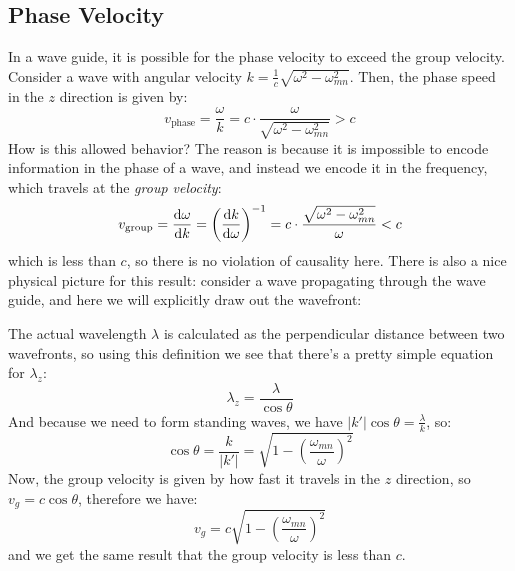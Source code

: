\subsection{Phase Velocity}
In a wave guide, it is possible for the phase velocity to exceed the group velocity. Consider a wave with
angular velocity \( k = \frac{1}{c}\sqrt{\omega^2 - \omega_{mn}^2} \). Then, the phase speed in the \( z \)
direction is given by:
\[
	v_\text{phase} = \frac{\omega}{k} = c \cdot \frac{\omega}{\sqrt{\omega^2 - \omega_{mn}^2}} > c
\]
How is this allowed behavior? The reason is because it is impossible to encode information in the phase of a
wave, and instead we encode it in the frequency, which travels at the \textit{group velocity}:
\[
	v_\text{group} = \dv{\omega}{k} = \left( \dv{k}{\omega} \right)^{-1} = c \cdot \frac{\sqrt{\omega^2 -
	\omega_{mn}^2}}{\omega} < c
\]
which is less than \( c \), so there is no violation of causality here. There is also a nice physical picture
for this result: consider a wave propagating through the wave guide, and here we will explicitly draw out the
wavefront:
\begin{center}
\end{center}
The actual wavelength \( \lambda \) is calculated as the perpendicular distance between two wavefronts, so
using this definition we see that there's a pretty simple equation for \( \lambda_z \):
\[
	\lambda_z = \frac{\lambda}{\cos \theta}
\]
And because we need to form standing waves, we have \( |k'| \cos \theta = \frac{\lambda}{k} \), so:
\[
	\cos \theta = \frac{k}{|k'|} = \sqrt{1 - \left( \frac{\omega_{mn}}{\omega} \right)^2}
\]
Now, the group velocity is given by how fast it travels in the \( z \) direction, so \( v_g = c \cos \theta
\), therefore we have:
\[
	v_g = c \sqrt{1 - \left( \frac{\omega_{mn}}{\omega} \right)^2}
\]
and we get the same result that the group velocity is less than \( c \). 

       



